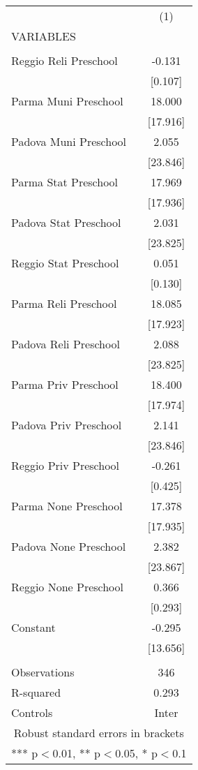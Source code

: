 \begin{tabular}{lc} \hline
 & (1) \\
VARIABLES &  \\ \hline
 &  \\
Reggio Reli Preschool & -0.131 \\
 & [0.107] \\
Parma Muni Preschool & 18.000 \\
 & [17.916] \\
Padova Muni Preschool & 2.055 \\
 & [23.846] \\
Parma Stat Preschool & 17.969 \\
 & [17.936] \\
Padova Stat Preschool & 2.031 \\
 & [23.825] \\
Reggio Stat Preschool & 0.051 \\
 & [0.130] \\
Parma Reli Preschool & 18.085 \\
 & [17.923] \\
Padova Reli Preschool & 2.088 \\
 & [23.825] \\
Parma Priv Preschool & 18.400 \\
 & [17.974] \\
Padova Priv Preschool & 2.141 \\
 & [23.846] \\
Reggio Priv Preschool & -0.261 \\
 & [0.425] \\
Parma None Preschool & 17.378 \\
 & [17.935] \\
Padova None Preschool & 2.382 \\
 & [23.867] \\
Reggio None Preschool & 0.366 \\
 & [0.293] \\
Constant & -0.295 \\
 & [13.656] \\
 &  \\
Observations & 346 \\
R-squared & 0.293 \\
 Controls & Inter \\ \hline
\multicolumn{2}{c}{ Robust standard errors in brackets} \\
\multicolumn{2}{c}{ *** p$<$0.01, ** p$<$0.05, * p$<$0.1} \\
\end{tabular}
